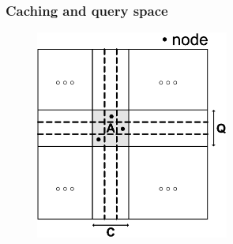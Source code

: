 \documentclass[red]{beamer}
\begin{document}
\begin{frame}
\frametitle{Caching and query space}

\begin{figure}
\centering
\includegraphics[width=2.5in]{figs/space}
\end{figure}

\end{frame}
\end{document}
